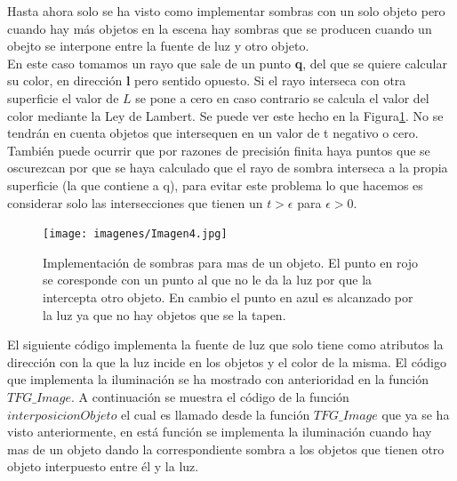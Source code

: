 Hasta ahora solo se ha visto como implementar sombras con un solo objeto pero cuando hay más objetos en la escena hay sombras que se producen cuando un obejto se interpone entre la fuente de luz y otro objeto.
	${ }$\\	
	
En este caso tomamos un rayo que sale de un punto \textbf{q}, del que se quiere calcular su color, en dirección \textbf{l} pero sentido opuesto. Si el rayo interseca con otra superficie el valor de $L$ se pone a cero en caso contrario se calcula el valor del color mediante la Ley de Lambert. Se puede ver este hecho en la Figura\ref{fig:etiq_6}. No se tendrán en cuenta objetos que intersequen en un valor de t negativo o cero.
	${ }$\\	
	
También puede ocurrir que por razones de precisión finita haya puntos que se oscurezcan por que se haya calculado que el rayo de sombra interseca a la propia superficie (la que contiene a q), para evitar este problema lo que hacemos es considerar solo las intersecciones que tienen un $t > \epsilon$ para $\epsilon > 0 $.
	${ }$\\	

\begin{figure}
	\begin{center}
		\texttt{[image: imagenes/Imagen4.jpg]}
	\end{center}
	\caption{Implementación de sombras para mas de un objeto. El punto en rojo se coresponde con un punto al que no le da la luz por que la intercepta otro objeto. En cambio el punto en azul es alcanzado por la luz ya que no hay objetos que se la tapen.}
	\label{fig:etiq_6}
\end{figure}

El siguiente código implementa la fuente de luz que solo tiene como atributos la dirección con la que la luz incide en los objetos y el color de la misma. El código que implementa la iluminación se ha mostrado con anterioridad en la función $TFG\_Image$. A continuación se muestra el código de la función $interposicionObjeto$ el cual es llamado desde la función $TFG\_Image$ que ya se ha visto anteriormente, en está función se implementa la iluminación cuando hay mas de un objeto dando la correspondiente sombra a los objetos que tienen otro objeto interpuesto entre él y la luz.





